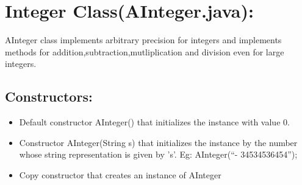 \documentclass{article}
\begin{document}
\section*{Integer Class(AInteger.java):}
AInteger class implements arbitrary precision for integers and implements methods for addition,subtraction,mutliplication and division even for large integers.

\subsection*{Constructors:}
\begin{itemize}
    \item Default constructor AInteger() that initializes the instance with value
0.
\item Constructor AInteger(String s) that initializes the instance by the
number whose string representation is given by ’s’. Eg: AInteger(“-
34534536454”);
\item Copy constructor that creates an instance of AInteger
\end{itemize}
\end{document}
